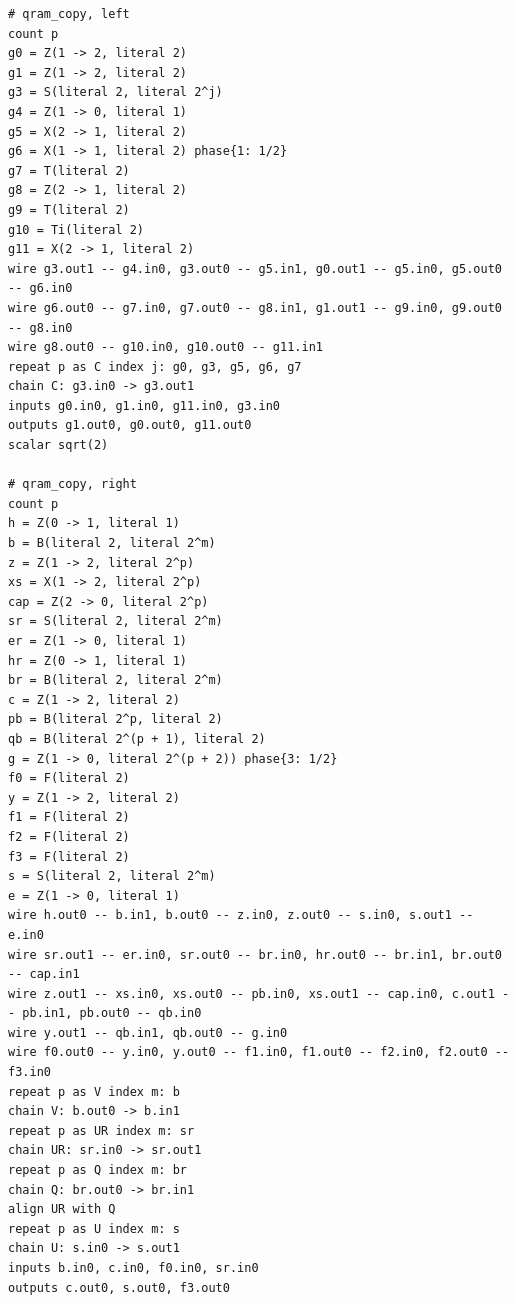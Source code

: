 \begin{lstlisting}[style=azx]
# qram_copy, left
count p
g0 = Z(1 -> 2, literal 2)
g1 = Z(1 -> 2, literal 2)
g3 = S(literal 2, literal 2^j)
g4 = Z(1 -> 0, literal 1)
g5 = X(2 -> 1, literal 2)
g6 = X(1 -> 1, literal 2) phase{1: 1/2}
g7 = T(literal 2)
g8 = Z(2 -> 1, literal 2)
g9 = T(literal 2)
g10 = Ti(literal 2)
g11 = X(2 -> 1, literal 2)
wire g3.out1 -- g4.in0, g3.out0 -- g5.in1, g0.out1 -- g5.in0, g5.out0 -- g6.in0
wire g6.out0 -- g7.in0, g7.out0 -- g8.in1, g1.out1 -- g9.in0, g9.out0 -- g8.in0
wire g8.out0 -- g10.in0, g10.out0 -- g11.in1
repeat p as C index j: g0, g3, g5, g6, g7
chain C: g3.in0 -> g3.out1
inputs g0.in0, g1.in0, g11.in0, g3.in0
outputs g1.out0, g0.out0, g11.out0
scalar sqrt(2)

# qram_copy, right
count p
h = Z(0 -> 1, literal 1)
b = B(literal 2, literal 2^m)
z = Z(1 -> 2, literal 2^p)
xs = X(1 -> 2, literal 2^p)
cap = Z(2 -> 0, literal 2^p)
sr = S(literal 2, literal 2^m)
er = Z(1 -> 0, literal 1)
hr = Z(0 -> 1, literal 1)
br = B(literal 2, literal 2^m)
c = Z(1 -> 2, literal 2)
pb = B(literal 2^p, literal 2)
qb = B(literal 2^(p + 1), literal 2)
g = Z(1 -> 0, literal 2^(p + 2)) phase{3: 1/2}
f0 = F(literal 2)
y = Z(1 -> 2, literal 2)
f1 = F(literal 2)
f2 = F(literal 2)
f3 = F(literal 2)
s = S(literal 2, literal 2^m)
e = Z(1 -> 0, literal 1)
wire h.out0 -- b.in1, b.out0 -- z.in0, z.out0 -- s.in0, s.out1 -- e.in0
wire sr.out1 -- er.in0, sr.out0 -- br.in0, hr.out0 -- br.in1, br.out0 -- cap.in1
wire z.out1 -- xs.in0, xs.out0 -- pb.in0, xs.out1 -- cap.in0, c.out1 -- pb.in1, pb.out0 -- qb.in0
wire y.out1 -- qb.in1, qb.out0 -- g.in0
wire f0.out0 -- y.in0, y.out0 -- f1.in0, f1.out0 -- f2.in0, f2.out0 -- f3.in0
repeat p as V index m: b
chain V: b.out0 -> b.in1
repeat p as UR index m: sr
chain UR: sr.in0 -> sr.out1
repeat p as Q index m: br
chain Q: br.out0 -> br.in1
align UR with Q
repeat p as U index m: s
chain U: s.in0 -> s.out1
inputs b.in0, c.in0, f0.in0, sr.in0
outputs c.out0, s.out0, f3.out0
\end{lstlisting}

